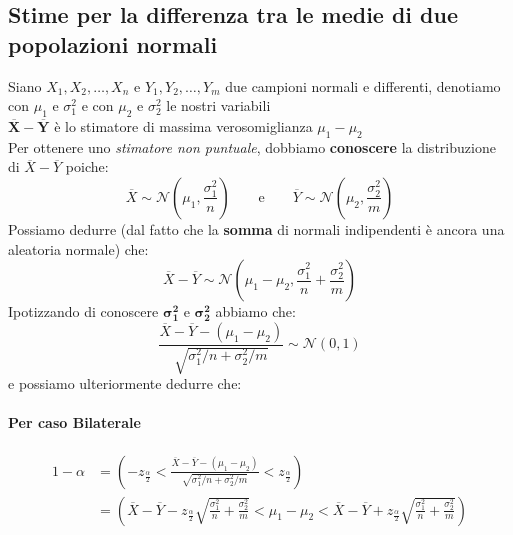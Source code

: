 \documentclass[]{article}
\begin{document}
    \subsection{Stime per la differenza tra le medie di due popolazioni normali}
    Siano $X_1, X_2, \ldots, X_n$ e $Y_1, Y_2, \ldots, Y_m$ due campioni normali e differenti, denotiamo con $\mu_1$ e $\sigma^2_1$ e con $\mu_2$ e $\sigma^2_2$ le nostri variabili\\
    $\boldsymbol{\overline{X} - \overline{Y}}$ è lo stimatore di massima verosomiglianza $\mu_1 - \mu_2$ \\
    Per ottenere uno \textit{stimatore non puntuale}, dobbiamo \textbf{conoscere} la distribuzione di $\overline{X} - \overline{Y}$ poiche:
    \[ \overline{X} \sim \mathcal{N} \left( \mu_1, \frac{\sigma^2_1}{n} \right)  \qquad \text{e} \qquad \overline{Y} \sim \mathcal{N}\left( \mu_2, \frac{\sigma^2_2}{m} \right) \]
    Possiamo dedurre (dal fatto che la \textbf{somma} di normali indipendenti è ancora una aleatoria normale) che:
    \[ \overline{X} - \overline{Y} \sim \mathcal{N}\left( \mu_1 - \mu_2, \frac{\sigma^2_1}{n} + \frac{\sigma^2_2}{m} \right) \]
    Ipotizzando di conoscere $\boldsymbol{\sigma^2_1}$ e $\boldsymbol{\sigma^2_2}$ abbiamo che:
    \[ \frac{\overline{X} - \overline{Y} - (\mu_1 - \mu_2)}{\sqrt{\sigma^2_1 / n + \sigma^2_2 / m}} \sim \mathcal{N}(0,1) \]
    e possiamo ulteriormente dedurre che:
    \paragraph{Per caso Bilaterale}
    \begin{equation*}
        \begin{aligned}
            1-\alpha & =\left(-z_{\frac{\alpha}{2}}<\frac{\overline{X}-\overline{Y}-\left(\mu_1-\mu_2\right)}{\sqrt{\sigma_1^2 / n+\sigma_2^2 / m}}<z_{\frac{\alpha}{2}}\right) \\
            & =\left(\overline{X}-\overline{Y}-z_{\frac{\alpha}{2}} \sqrt{\frac{\sigma_1^2}{n}+\frac{\sigma_2^2}{m}}<\mu_1-\mu_2<\overline{X}-\overline{Y}+z_{\frac{\alpha}{2}} \sqrt{\frac{\sigma_1^2}{n}+\frac{\sigma_2^2}{m}}\right)
        \end{aligned}
    \end{equation*}
\end{document}
